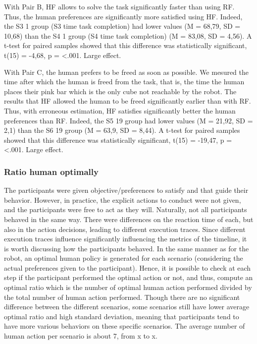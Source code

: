 With Pair B, HF allows to solve the task significantly faster than using RF. Thus, the human preferences are significantly more satisfied using HF.   
Indeed, the S3 1 group (S3 time task completion) had lower values (M = 68,79, SD = 10,68) than the S4 1 group (S4 time task completion) (M = 83,08, SD = 4,56). A t-test for paired samples showed that this difference was statistically significant, t(15) = -4,68, p = <.001. Large effect.

With Pair C, the human prefers to be freed as soon as possible. We mesured the time after which the human is freed from the task, that is, the time the human places their pink bar which is the only cube not reachable by the robot. The results that HF allowed the human to be freed significantly earlier than with RF. Thus, with erroneous estimation, HF satisfies significantly better the human preferences than RF.
Indeed, the S5 19 group had lower values (M = 21,92, SD = 2,1) than the S6 19 group (M = 63,9, SD = 8,44). A t-test for paired samples showed that this difference was statistically significant, t(15) = -19,47, p = <.001. Large effect. 

\subsubsection*{Ratio human optimally}
The participants were given objective/preferences to satisfy and that guide their behavior. However, in practice, the explicit actions to conduct were not given, and the participants were free to act as they will. Naturally, not all participants behaved in the same way. There were differences on the reaction time of each, but also in the action decisions, leading to different execution traces. Since different execution traces influence significantly influencing the metrics of the timeline, it is worth discussing how the participants behaved.
In the same manner as for the robot, an optimal human policy is generated for each scenario (considering the actual preferences given to the participant). Hence, it is possible to check at each step if the participant performed the optimal action or not, and thus, compute an optimal ratio which is the number of optimal human action performed divided by the total number of human action performed.  
Though there are no significant difference between the different scenarios, some scenarios still have lower average optimal ratio and high standard deviation, meaning that participants tend to have more various behaviors on these specific scenarios. 
The average number of human action per scenario is about 7, from x to x. 


